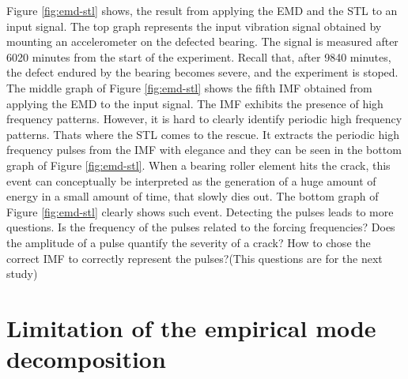 \documentclass[../Main/thesis.tex]{subfiles}
\begin{document}
\justify
Figure \ref{fig:emd-stl} shows, the result from applying the EMD and the STL to an input signal. The top graph represents the input vibration signal obtained by mounting an accelerometer on the defected bearing. The signal is measured after 6020 minutes from the start of the experiment. Recall that, after 9840 minutes, the defect endured by the bearing becomes severe, and the experiment is stoped. The middle graph of Figure \ref{fig:emd-stl} shows the fifth IMF obtained from applying the EMD to the input signal. The IMF exhibits the presence of high frequency patterns. However, it is hard to clearly  identify periodic high frequency patterns. Thats where the STL comes to the rescue. It extracts the periodic high frequency pulses from the IMF with elegance and they can be seen in the bottom graph of Figure \ref{fig:emd-stl}. When a bearing roller element hits the crack, this event can conceptually be interpreted as the generation of a huge amount of energy in a small amount of time, that slowly dies out. The bottom graph of Figure \ref{fig:emd-stl} clearly shows such event.
\justify
Detecting the pulses leads to more questions. Is the frequency of the pulses related to the forcing frequencies? Does the amplitude of a pulse quantify the severity of a crack? How to chose the correct IMF to correctly represent the pulses?(This questions are for the next study) 



 

\section{Limitation of the empirical mode decomposition}
\label{sec:limitation}





\blankpage
\end{document}
